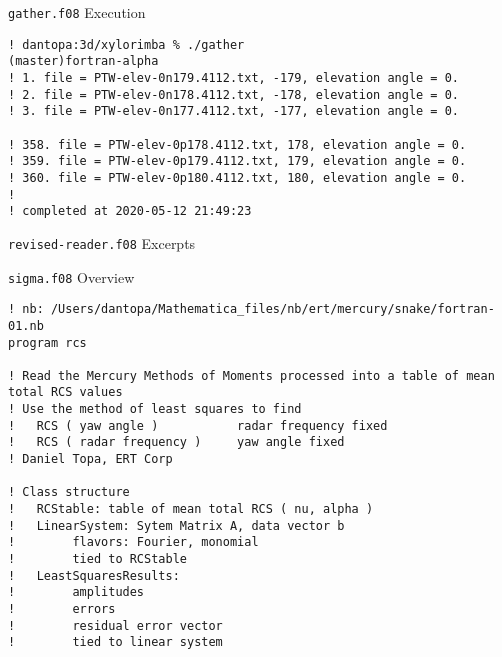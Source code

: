 \begin{frame} {\texttt{gather.f08} Execution}
\scriptsize
\begin{lstlisting}[style=terminal, breaklines=true, caption={Excerpt from \texttt{gather.f08}}, label={lst:gather-execution}]
! dantopa:3d/xylorimba % ./gather                                                                                                                             (master)fortran-alpha
! 1. file = PTW-elev-0n179.4112.txt, -179, elevation angle = 0.
! 2. file = PTW-elev-0n178.4112.txt, -178, elevation angle = 0.
! 3. file = PTW-elev-0n177.4112.txt, -177, elevation angle = 0.

! 358. file = PTW-elev-0p178.4112.txt, 178, elevation angle = 0.
! 359. file = PTW-elev-0p179.4112.txt, 179, elevation angle = 0.
! 360. file = PTW-elev-0p180.4112.txt, 180, elevation angle = 0.
!
! completed at 2020-05-12 21:49:23
\end{lstlisting}
\end{frame}

\begin{frame}{\texttt{revised-reader.f08} Excerpts}
\scriptsize



\end{frame}


\begin{frame}{\texttt{sigma.f08} Overview}
\scriptsize
\begin{lstlisting}[style=terminal, breaklines=true, caption={Excerpt from \texttt{sigma.f08}}, label={lst:sigma-overview}]
! nb: /Users/dantopa/Mathematica_files/nb/ert/mercury/snake/fortran-01.nb
program rcs

! Read the Mercury Methods of Moments processed into a table of mean total RCS values
! Use the method of least squares to find
!   RCS ( yaw angle )           radar frequency fixed
!   RCS ( radar frequency )     yaw angle fixed
! Daniel Topa, ERT Corp

! Class structure
!   RCStable: table of mean total RCS ( nu, alpha )
!   LinearSystem: Sytem Matrix A, data vector b
!        flavors: Fourier, monomial
!        tied to RCStable
!   LeastSquaresResults:
!        amplitudes
!        errors
!        residual error vector
!        tied to linear system
\end{lstlisting}
\end{frame}
 
\endinput  %
